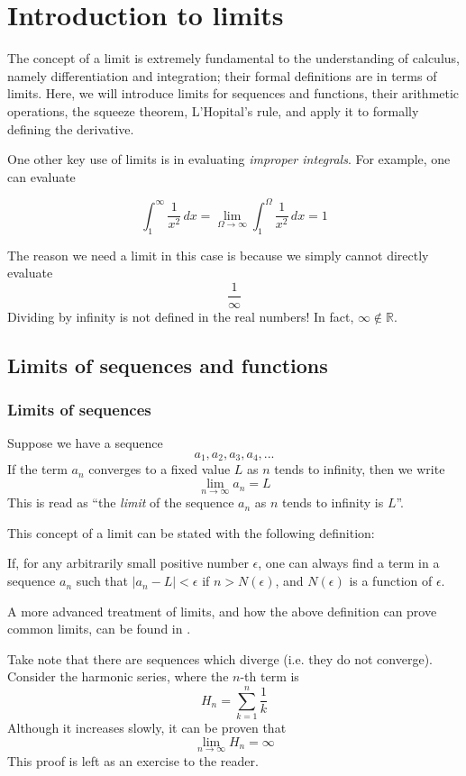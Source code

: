 \chapter{Introduction to limits}
The concept of a limit is extremely fundamental to the understanding of calculus, namely differentiation
and integration; their formal definitions are in terms of limits. Here, we will introduce limits for
sequences and functions, their arithmetic operations, the squeeze theorem, L'Hopital's rule, and
apply it to formally defining the derivative.

One other key use of limits is in evaluating \textit{improper integrals}. For example, one can
evaluate

\[\int_{1}^{\infty} \frac{1}{x^2} \, dx = \lim_{\Omega \to \infty} \int_{1}^{\Omega} \frac{1}{x^2} \, dx = 1\]

The reason we need a limit in this case is because we simply cannot directly evaluate
\[\frac{1}{\infty}\]
Dividing by infinity is not defined in the real numbers! In fact, $\infty \notin \mathbb{\mathbb{R}}$.

\section{Limits of sequences and functions}

\subsection{Limits of sequences}
Suppose we have a sequence
\[
a_1,a_2,a_3,a_4,...
\]
If the term $a_n$ converges to a fixed value $L$ as $n$ tends to infinity, then we write
\[
\lim_{n \to \infty} a_n = L
\]
This is read as ``the \textit{limit} of the sequence ${a_n}$ as $n$ tends to infinity is $L$''.

This concept of a limit can be stated with the following definition:
\begin{definition}
    If, for any arbitrarily small positive number $\epsilon$, one can always find a term in a sequence ${a_n}$
    such that $|a_n - L| < \epsilon$ if $n > N(\epsilon)$, and $N(\epsilon)$ is a function of $\epsilon$.
\end{definition}

A more advanced treatment of limits, and how the above definition can prove common limits, can be found in
\cite{Gong_2017}.

Take note that there are sequences which diverge (i.e. they do not converge). Consider the harmonic series,
where the $n$-th term is \[H_n = \sum_{k = 1}^n \frac{1}{k}\] Although it increases slowly, it can be proven
that \[\lim_{n \to \infty} H_n = \infty\] This proof is left as an exercise to the reader.

